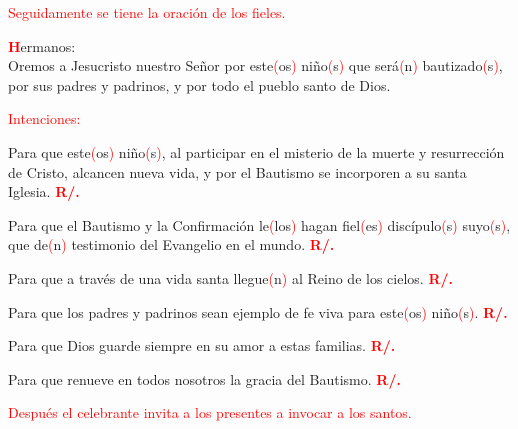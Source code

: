 \documentclass[12pt, letterpaper]{report}
\begin{document}
\large {\textcolor{red}{Seguidamente se tiene la oraci\'on de los fieles.}} 

\lettrine[lines=1]{\bfseries \textcolor{red}{H}}{}\Large ermanos:\\
Oremos a Jesucristo nuestro Se\~nor por este\textcolor{red}{(}os\textcolor{red}{)} ni\~no\textcolor{red}{(}s\textcolor{red}{)} que ser\'a\textcolor{red}{(}n\textcolor{red}{)} bautizado\textcolor{red}{(}s\textcolor{red}{)}, por sus padres y padrinos, y por todo el pueblo santo de Dios.

\noindent
\large {\textcolor{red}{Intenciones:}} 

\noindent
\Large {Para que este\textcolor{red}{(}os\textcolor{red}{)} ni\~no\textcolor{red}{(}s\textcolor{red}{)}, al participar en el misterio de la muerte y resurrecci\'on de Cristo, alcancen nueva vida, y por el Bautismo se incorporen a su santa Iglesia.
\hspace{1cm} \bfseries \textcolor{red}{R/.}}

\noindent
\Large {Para que el Bautismo y la Confirmaci\'on le\textcolor{red}{(}los\textcolor{red}{)} hagan fiel\textcolor{red}{(}es\textcolor{red}{)} disc\'ipulo\textcolor{red}{(}s\textcolor{red}{)} suyo\textcolor{red}{(}s\textcolor{red}{)}, que de\textcolor{red}{(}n\textcolor{red}{)} testimonio del Evangelio en el mundo. 
\hspace{1cm} \bfseries \textcolor{red}{R/.}}

\noindent
\Large {Para que a trav\'es de una vida santa llegue\textcolor{red}{(}n\textcolor{red}{)} al Reino de los cielos.
\hspace{1cm} \bfseries \textcolor{red}{R/.}}

\newpage

\noindent
\Large {Para que los padres y padrinos sean ejemplo de fe viva para este\textcolor{red}{(}os\textcolor{red}{)} ni\~no\textcolor{red}{(}s\textcolor{red}{)}.
\hspace{1cm} \bfseries \textcolor{red}{R/.}}

\noindent
\Large {Para que Dios guarde siempre en su amor a estas familias.
\hspace{1cm} \bfseries \textcolor{red}{R/.}}

\noindent
\Large {Para que renueve en todos nosotros la gracia del Bautismo.
\hspace{1cm} \bfseries \textcolor{red}{R/.}}

\large {\textcolor{red}{Despu\'es el celebrante invita a los presentes a invocar a los santos.}} 
\end{document}
